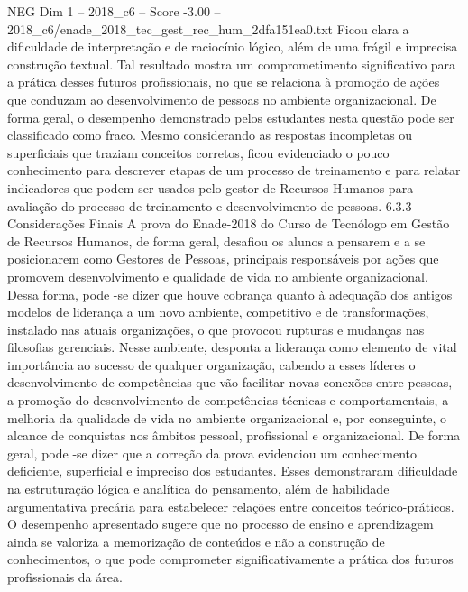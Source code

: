 \begin{textsample}{NEG Dim 1 – 2018\_c6 – Score -3.00 – 2018\_c6/enade\_2018\_tec\_gest\_rec\_hum\_2dfa151ea0.txt}
Ficou clara a dificuldade de interpretação e de raciocínio lógico, além de uma frágil e imprecisa construção textual.
Tal resultado mostra um comprometimento significativo para a prática desses futuros profissionais, no que se relaciona à promoção de ações que conduzam ao desenvolvimento de pessoas no ambiente organizacional.
De forma geral, o desempenho demonstrado pelos estudantes nesta questão pode ser classificado como fraco.
Mesmo considerando as respostas incompletas ou superficiais que traziam conceitos corretos, ficou evidenciado o pouco conhecimento para descrever etapas de um processo de treinamento e para relatar indicadores que podem ser usados pelo gestor de Recursos Humanos para avaliação do processo de treinamento e desenvolvimento de pessoas. 6.3.3 Considerações Finais A prova do Enade-2018 do Curso de Tecnólogo em Gestão de Recursos Humanos, de forma geral, desafiou os alunos a pensarem e a se posicionarem como Gestores de Pessoas, principais responsáveis por ações que promovem desenvolvimento e qualidade de vida no ambiente organizacional.
Dessa forma, pode -se dizer que houve cobrança quanto à adequação dos antigos modelos de liderança a um novo ambiente, competitivo e de transformações, instalado nas atuais organizações, o que provocou rupturas e mudanças nas filosofias gerenciais.
Nesse ambiente, desponta a liderança como elemento de vital importância ao sucesso de qualquer organização, cabendo a esses líderes o desenvolvimento de competências que vão facilitar novas conexões entre pessoas, a promoção do desenvolvimento de competências técnicas e comportamentais, a melhoria da qualidade de vida no ambiente organizacional e, por conseguinte, o alcance de conquistas nos âmbitos pessoal, profissional e organizacional.
De forma geral, pode -se dizer que a correção da prova evidenciou um conhecimento deficiente, superficial e impreciso dos estudantes.
Esses demonstraram dificuldade na estruturação lógica e analítica do pensamento, além de habilidade argumentativa precária para estabelecer relações entre conceitos teórico-práticos.
O desempenho apresentado sugere que no processo de ensino e aprendizagem ainda se valoriza a memorização de conteúdos e não a construção de conhecimentos, o que pode comprometer significativamente a prática dos futuros profissionais da área.

\end{textsample}
